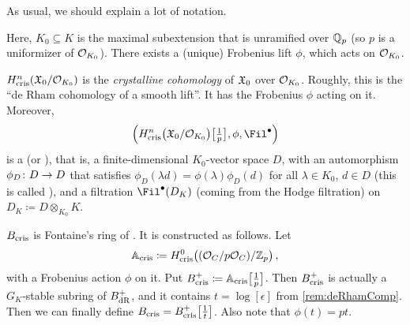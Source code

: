 \documentclass[a4paper, 10pt, oneside, DIV=9, chapterprefix=true, numbers=enddot,bibliography=totoc]{scrbook}
\begin{document}
\begin{rem}
	As usual, we should explain a lot of notation.
	\begin{numerate}
		\item Here, $K_0\subseteq K$ is the maximal subextension that is unramified over $\mathbb{Q}_p$ (so $p$ is a uniformizer of $\mathcal{O}_{K_0}$). There exists a (unique) Frobenius lift $\phi$, which acts on $\mathcal{O}_{K_0}$.
		\item $H_{\mathrm{cris}}^n(\mathfrak{X}_0/\mathcal{O}_{K_0})$ is the \emph{crystalline cohomology} of $\mathfrak{X}_0$ over $\mathcal{O}_{K_0}$. Roughly, this is the \enquote{de Rham cohomology of a smooth lift}. It has the Frobenius $\phi$ acting on it. Moreover,
		\begin{equation*}
			\Big(H_\cris^n\big(\XX_0/\Oo_{K_0}\big)\big[\textstyle\frac 1p\big], \phi, \Fil^\bullet\Big)
		\end{equation*}
		is a  (or ), that is, a finite-dimensional $K_0$-vector space $D$, with an automorphism $\phi_D\colon D\morphism D$ that satisfies $\phi_D(\lambda d)=\phi(\lambda)\phi_D(d)$ for all $\lambda\in K_0$, $d\in D$ (this is called ), and a filtration $\Fil^\bullet(D_K)$ (coming from the Hodge filtration) on $D_K\coloneqq D\otimes_{K_0}K$.
		\item $B_{\mathrm{cris}}$ is Fontaine's ring of . It is constructed as follows. Let
		\begin{equation*}
			\mathbb{A}_{\mathrm{cris}}\coloneqq H_{\mathrm{cris}}^0\big((\mathcal{O}_C/p\mathcal{O}_C)/\mathbb{Z}_p\big)\,,
		\end{equation*}
		with a Frobenius action $\phi$ on it. Put $B_{\mathrm{cris}}^+\coloneqq \mathbb{A}_{\mathrm{cris}}\big[\frac1p\big]$. Then $B_{\mathrm{cris}}^+$ is actually a $G_K$-stable subring of $B_{\mathrm{dR}}^+$, and it contains $t=\log{}[\epsilon]$ from \cref{rem:deRhamComp}. Then we can finally define $B_{\mathrm{cris}}=B_{\mathrm{cris}}^+\big[\frac1t\big]$. Also note that $\phi(t)=pt$.
		

\end{numerate}
\end{rem}
\end{document}
